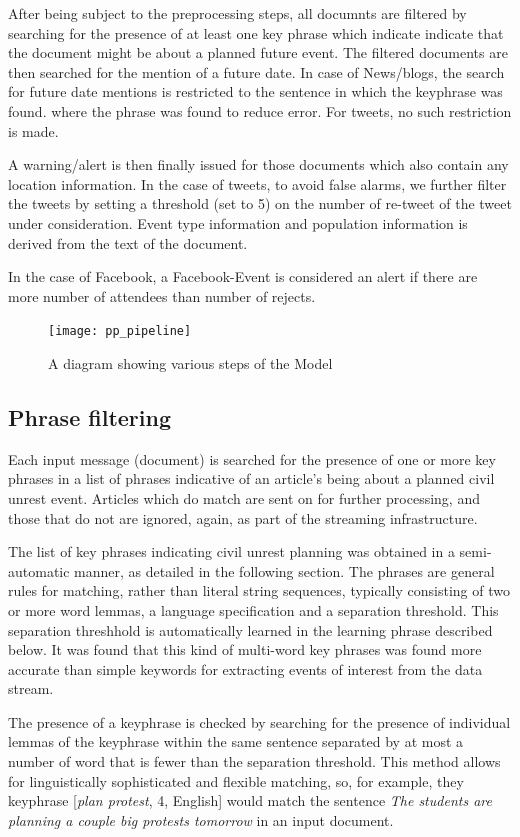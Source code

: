 After being subject to the preprocessing steps, all documnts are
filtered by searching for the presence of at least one key phrase
which indicate indicate that the document might be about a planned
future event.  The filtered documents are then searched for the
mention of a future date. In case of News/blogs, the search for future
date mentions is restricted to the sentence in which the keyphrase was
found.  where the phrase was found to reduce error. For tweets, no
such restriction is made.

A warning/alert is then finally issued for those documents which also
contain any location information.  In the case of tweets, to avoid
false alarms, we further filter the tweets by setting a threshold (set
to 5) on the number of re-tweet of the tweet under consideration.
Event type information and population information is derived from the
text of the document.

In the case of Facebook, a Facebook-Event is considered an alert if there are more number of attendees than number of rejects.

\begin{figure}
\texttt{[image: pp\_pipeline]}
\caption{A diagram showing various steps of the Model}
\end{figure}

\subsection{Phrase filtering}

Each input message (document) is searched for the presence of one or
more key phrases in a list of phrases indicative of an article's being
about a planned civil unrest event.  Articles which do match are sent on for further processing,
and those that do not are ignored, again, as part of the streaming infrastructure.

The list of key phrases indicating civil unrest planning was obtained
in a semi-automatic manner, as detailed in the following section. The
phrases are general rules for matching, rather than literal string
sequences, typically consisting of two or more word lemmas, a language
specification and a separation threshold. This separation threshhold is automatically learned
in the learning phrase described below.  It was found that this kind of multi-word key phrases was found more accurate than simple
keywords for extracting events of interest from the data stream.

The presence of a keyphrase is checked by searching for the presence of
individual lemmas of the keyphrase within the same sentence separated
by at most a number of word that is fewer than the separation threshold.  
This method allows for linguistically sophisticated and flexible matching, so, for example,
they keyphrase [{\em plan protest}, 4, English] would match the sentence
{\em The students are planning a couple big protests tomorrow} in an input document.


